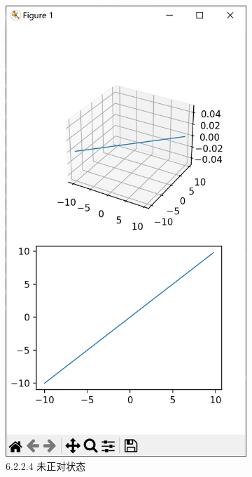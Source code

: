 \documentclass[12pt]{article}
\begin{document}
\begin{figure}[H]
    \centering
    \begin{subfigure}[b]{0.4\textwidth}
        \includegraphics[width=\textwidth]{3D mesh Pic2.1.png} %
        \caption{6.2.2.4 未正对状态}
        \label{fig:line-graph2}
    \end{subfigure}
    \hfill
    \begin{subfigure}[b]{0.4\textwidth}

\end{subfigure}
\end{figure}
\end{document}
